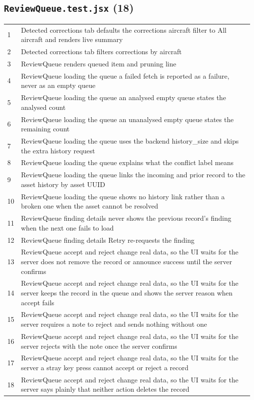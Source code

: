 \subsection*{\texttt{ReviewQueue.test.jsx} (18)}
\begin{longtable}{p{}p{}}
1 & Detected corrections tab defaults the corrections aircraft filter to All aircraft and renders live summary \\
2 & Detected corrections tab filters corrections by aircraft \\
3 & ReviewQueue renders queued item and pruning line \\
4 & ReviewQueue loading the queue a failed fetch is reported as a failure, never as an empty queue \\
5 & ReviewQueue loading the queue an analysed empty queue states the analysed count \\
6 & ReviewQueue loading the queue an unanalysed empty queue states the remaining count \\
7 & ReviewQueue loading the queue uses the backend history\_size and skips the extra history request \\
8 & ReviewQueue loading the queue explains what the conflict label means \\
9 & ReviewQueue loading the queue links the incoming and prior record to the asset history by asset UUID \\
10 & ReviewQueue loading the queue shows no history link rather than a broken one when the asset cannot be resolved \\
11 & ReviewQueue finding details never shows the previous record's finding when the next one fails to load \\
12 & ReviewQueue finding details Retry re-requests the finding \\
13 & ReviewQueue accept and reject change real data, so the UI waits for the server does not remove the record or announce success until the server confirms \\
14 & ReviewQueue accept and reject change real data, so the UI waits for the server keeps the record in the queue and shows the server reason when accept fails \\
15 & ReviewQueue accept and reject change real data, so the UI waits for the server requires a note to reject and sends nothing without one \\
16 & ReviewQueue accept and reject change real data, so the UI waits for the server rejects with the note once the server confirms \\
17 & ReviewQueue accept and reject change real data, so the UI waits for the server a stray key press cannot accept or reject a record \\
18 & ReviewQueue accept and reject change real data, so the UI waits for the server says plainly that neither action deletes the record \\
\end{longtable}
